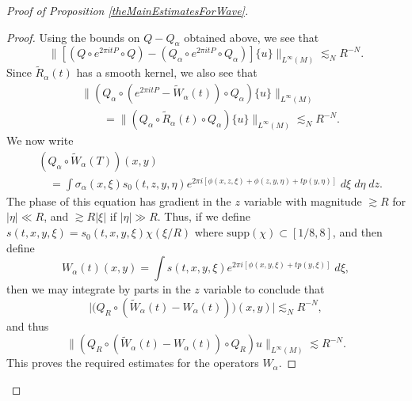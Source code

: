 \begin{proof}[Proof of Proposition \ref{theMainEstimatesForWave}]
\begin{proof}
    Using the bounds on $Q - Q_\alpha$ obtained above, we see that
    \begin{equation} \big\| [(Q \circ e^{2 \pi i t P} \circ Q) - (Q_\alpha \circ e^{2 \pi i t P} \circ Q_\alpha)] \{ u \} \big\|_{L^\infty(M)} \lesssim_N R^{-N}. \end{equation}
    Since $\tilde{R}_\alpha(t)$ has a smooth kernel, we also see that
    \begin{equation}
    \begin{split}
        &\big\| (Q_\alpha \circ (e^{2 \pi i t P} - \tilde{W}_\alpha(t)) \circ Q_\alpha) \{ u \} \big\|_{L^\infty(M)}\\
        &\quad\quad = \big\| (Q_\alpha \circ \tilde{R}_\alpha(t) \circ Q_\alpha) \{ u \} \big\|_{L^\infty(M)} \lesssim_N R^{-N}.
    \end{split}
    \end{equation}
    We now write
    \begin{equation}
    \begin{split}
        &(Q_\alpha \circ \tilde{W}_\alpha(T))(x,y)\\
        &\quad = \int \sigma_\alpha(x,\xi) s_0(t,z,y,\eta) e^{2 \pi i [\phi(x,z,\xi) + \phi(z,y,\eta) + t p(y,\eta) ]}\; d\xi\; d\eta\; dz.
    \end{split}
    \end{equation}
    The phase of this equation has gradient in the $z$ variable with magnitude $\gtrsim R$ for $|\eta| \ll R$, and $\gtrsim R |\xi|$ if $|\eta| \gg R$. Thus, if we define $s(t,x,y,\xi) = s_0(t,x,y,\xi) \chi(\xi / R)$ where $\text{supp}(\chi) \subset [1/8,8]$, and then define
    \begin{equation} W_\alpha(t)(x,y) = \int s(t,x,y,\xi) e^{2 \pi i [ \phi(x,y,\xi) + t p(y,\xi) ]}\; d\xi, \end{equation}
    then we may integrate by parts in the $z$ variable to conclude that
    \begin{equation} \Big|\big(Q_R \circ (\tilde{W}_\alpha(t) - W_\alpha(t)) \big)(x,y) \Big| \lesssim_N R^{-N}, \end{equation}
    and thus
    \begin{equation} \| (Q_R \circ (\tilde{W}_\alpha(t) - W_\alpha(t)) \circ Q_R) u \|_{L^\infty(M)} \lesssim R^{-N}. \end{equation}
    This proves the required estimates for the operators $W_\alpha$.
\end{proof}


\end{proof}

